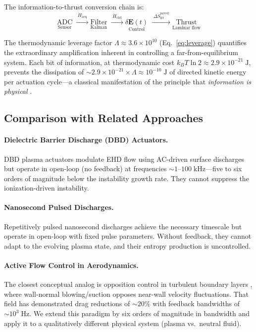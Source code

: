\documentclass[12pt,twocolumn]{article}
\newcommand{\ee}{\mathbf{E}}
\newcommand{\Sdot}{\dot{S}_{\mathrm{irr}}}
\begin{document}
The information-to-thrust conversion chain is:
\begin{equation}
  \underset{\text{Sensor}}{\text{ADC}}
  \;\xrightarrow{\;\dot{H}_{\mathrm{acq}}\;}
  \underset{\text{Kalman}}{\text{Filter}}
  \;\xrightarrow{\;\dot{H}_{\mathrm{ctrl}}\;}
  \underset{\text{Control}}{\delta\ee(t)}
  \;\xrightarrow{\;\Delta\Sdot^{\mathrm{saved}}\;}
  \underset{\text{Laminar flow}}{\text{Thrust}}
  \label{eq:info_chain}
\end{equation}

The thermodynamic leverage factor
$\Lambda \approx 3.6 \times 10^{10}$ (Eq.~\ref{eq:leverage})
quantifies the extraordinary amplification inherent in controlling
a far-from-equilibrium system. Each bit of information, at
thermodynamic cost $k_B T \ln 2 \approx 2.9 \times 10^{-21}\;\mathrm{J}$,
prevents the dissipation of $\sim 2.9 \times 10^{-21} \times
\Lambda \approx 10^{-10}\;\mathrm{J}$ of directed kinetic energy
per actuation cycle---a classical manifestation of the principle
that \emph{information is physical} \cite{Landauer1961}.

\subsection{Comparison with Related Approaches}
\label{sec:discussion:comparison}

\paragraph{Dielectric Barrier Discharge (DBD) Actuators.}
DBD plasma actuators \cite{Moreau2007, Corke2010} modulate EHD flow
using AC-driven surface discharges but operate in open-loop
(no feedback) at frequencies $\sim 1$--$100\;\mathrm{kHz}$---five
to six orders of magnitude below the instability growth rate.
They cannot suppress the ionization-driven instability.

\paragraph{Nanosecond Pulsed Discharges.}
Repetitively pulsed nanosecond discharges \cite{Starikovskiy2013,
Adamovich2017} achieve the necessary timescale but operate in
open-loop with fixed pulse parameters. Without feedback, they cannot
adapt to the evolving plasma state, and their entropy production is
uncontrolled.

\paragraph{Active Flow Control in Aerodynamics.}
The closest conceptual analog is opposition control in turbulent
boundary layers \cite{Choi1994, Kim2003, Bewley2001}, where
wall-normal blowing/suction opposes near-wall velocity fluctuations.
That field has demonstrated drag reductions of $\sim 20\%$ with
feedback bandwidths of $\sim 10^3\;\mathrm{Hz}$. We extend this
paradigm by six orders of magnitude in bandwidth and apply it to
a qualitatively different physical system (plasma vs.\ neutral fluid).
\end{document}
